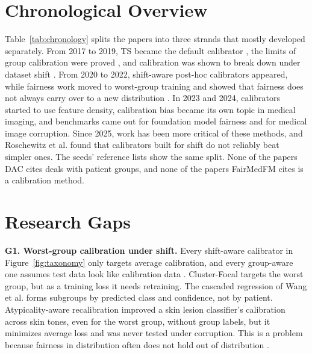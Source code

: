 \documentclass[sigconf,nonacm]{acmart}
\begin{document}
\section{Chronological Overview}
\label{sec:chronology}

Table~\ref{tab:chronology} splits the papers into three strands that mostly developed separately. From 2017 to 2019, TS became the default calibrator \cite{guo2017calibration}, the limits of group calibration were proved \cite{pleiss2017fairness}, and calibration was shown to break down under dataset shift \cite{ovadia2019trust}. From 2020 to 2022, shift-aware post-hoc calibrators appeared, while fairness work moved to worst-group training \cite{sagawa2020groupdro} and showed that fairness does not always carry over to a new distribution \cite{schrouff2022diagnosing}. In 2023 and 2024, calibrators started to use feature density, calibration bias became its own topic in medical imaging, and benchmarks came out for foundation model fairness and for medical image corruption. Since 2025, work has been more critical of these methods, and Roschewitz et al. \cite{roschewitz2025where} found that calibrators built for shift do not reliably beat simpler ones. The seeds' reference lists show the same split. None of the papers DAC cites deals with patient groups, and none of the papers FairMedFM cites is a calibration method.

\section{Research Gaps}
\label{sec:gaps}

\textbf{G1. Worst-group calibration under shift.} Every shift-aware calibrator in Figure~\ref{fig:taxonomy} only targets average calibration, and every group-aware one assumes test data look like calibration data \cite{pleiss2017fairness,hebertjohnson2018multicalibration,salvador2022faircal,shen2025calin}. Cluster-Focal \cite{shui2023clusterfocal} targets the worst group, but as a training loss it needs retraining. The cascaded regression of Wang et al. \cite{wang2024cascaded} forms subgroups by predicted class and confidence, not by patient. Atypicality-aware recalibration \cite{yuksekgonul2023atypicality} improved a skin lesion classifier's calibration across skin tones, even for the worst group, without group labels, but it minimizes average loss and was never tested under corruption. This is a problem because fairness in distribution often does not hold out of distribution \cite{schrouff2022diagnosing,yang2024limits}.
\end{document}
